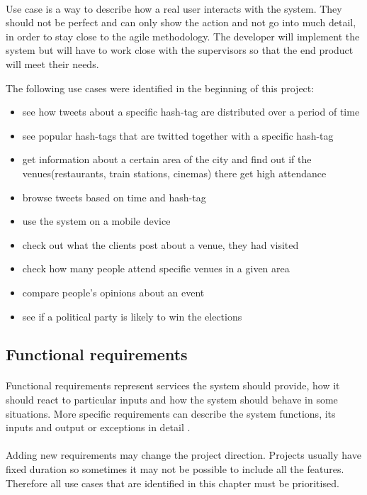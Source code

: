 \documentclass{l4proj}
\begin{document}
\paragraph{}
Use case is a way to describe how a real user interacts with the system. They should not be perfect and can only show the action and not go into much detail, in order to stay close to the agile methodology. The developer will implement the system but will have to work close with the supervisors so that the end product will meet their needs. 

The following use cases were identified in the beginning of this project: 


\begin{itemize}%
	\item see how tweets about a specific hash-tag are distributed over a period of time
	\item see popular hash-tags that are twitted together with a specific hash-tag
	\item get information about a certain area of the city and find out if the venues(restaurants, train stations, cinemas) there get high attendance
	\item browse tweets based on time and hash-tag
	\item use the system on a mobile device
	\item check out what the clients post about a venue, they had visited
	\item check how many people attend specific venues in a given area
	\item compare people's opinions about an event
	\item see if a political party is likely to win the elections
\end{itemize}


\subsection{Functional requirements} 
\label{sec:functional-requirements}
\paragraph{}
Functional requirements represent services the system should provide, how it should react to particular inputs and how the system should behave in some situations. More specific requirements can describe the system functions, its inputs and output or exceptions in detail \cite{sene}. 
\paragraph{}
Adding new requirements may change the project direction. Projects usually have fixed duration so sometimes it may not be possible to include all the features. Therefore all use cases that are identified in this chapter must be prioritised. 
\end{document}
